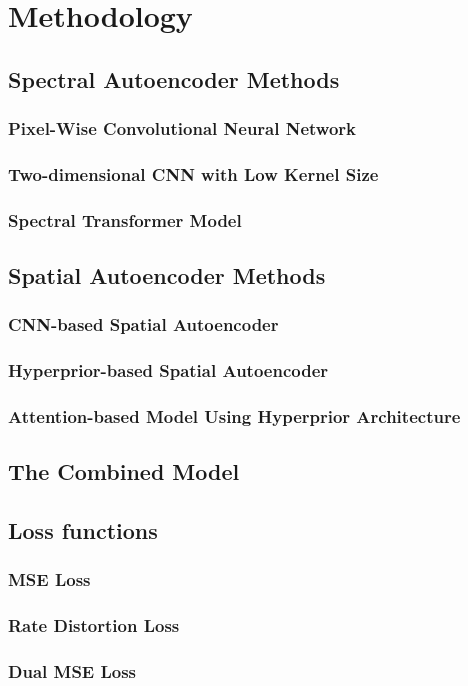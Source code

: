 \chapter{Methodology\label{cha:chapter4}}

\section{Spectral Autoencoder Methods}

\subsection{Pixel-Wise Convolutional Neural Network\label{sec:ch3xxx}}

\subsection{Two-dimensional CNN with Low Kernel Size\label{sec:ch3yyy}}

\subsection{Spectral Transformer Model}

\section{Spatial Autoencoder Methods\label{sec:ch3zzz}}

\subsection{CNN-based Spatial Autoencoder}

\subsection{Hyperprior-based Spatial Autoencoder}

\subsection{Attention-based Model Using Hyperprior Architecture}

\section{The Combined Model}

\section{Loss functions}

\subsection{MSE Loss}

\subsection{Rate Distortion Loss}

\subsection{Dual MSE Loss}

